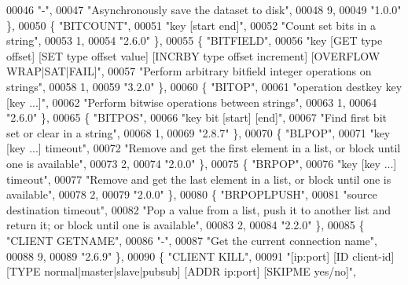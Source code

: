 \begin{DoxyCode}
00046     \textcolor{stringliteral}{"-"},
00047     \textcolor{stringliteral}{"Asynchronously save the dataset to disk"},
00048     9,
00049     \textcolor{stringliteral}{"1.0.0"} \},
00050     \{ \textcolor{stringliteral}{"BITCOUNT"},
00051     \textcolor{stringliteral}{"key [start end]"},
00052     \textcolor{stringliteral}{"Count set bits in a string"},
00053     1,
00054     \textcolor{stringliteral}{"2.6.0"} \},
00055     \{ \textcolor{stringliteral}{"BITFIELD"},
00056     \textcolor{stringliteral}{"key [GET type offset] [SET type offset value] [INCRBY type offset increment] [OVERFLOW
       WRAP|SAT|FAIL]"},
00057     \textcolor{stringliteral}{"Perform arbitrary bitfield integer operations on strings"},
00058     1,
00059     \textcolor{stringliteral}{"3.2.0"} \},
00060     \{ \textcolor{stringliteral}{"BITOP"},
00061     \textcolor{stringliteral}{"operation destkey key [key ...]"},
00062     \textcolor{stringliteral}{"Perform bitwise operations between strings"},
00063     1,
00064     \textcolor{stringliteral}{"2.6.0"} \},
00065     \{ \textcolor{stringliteral}{"BITPOS"},
00066     \textcolor{stringliteral}{"key bit [start] [end]"},
00067     \textcolor{stringliteral}{"Find first bit set or clear in a string"},
00068     1,
00069     \textcolor{stringliteral}{"2.8.7"} \},
00070     \{ \textcolor{stringliteral}{"BLPOP"},
00071     \textcolor{stringliteral}{"key [key ...] timeout"},
00072     \textcolor{stringliteral}{"Remove and get the first element in a list, or block until one is available"},
00073     2,
00074     \textcolor{stringliteral}{"2.0.0"} \},
00075     \{ \textcolor{stringliteral}{"BRPOP"},
00076     \textcolor{stringliteral}{"key [key ...] timeout"},
00077     \textcolor{stringliteral}{"Remove and get the last element in a list, or block until one is available"},
00078     2,
00079     \textcolor{stringliteral}{"2.0.0"} \},
00080     \{ \textcolor{stringliteral}{"BRPOPLPUSH"},
00081     \textcolor{stringliteral}{"source destination timeout"},
00082     \textcolor{stringliteral}{"Pop a value from a list, push it to another list and return it; or block until one is available"},
00083     2,
00084     \textcolor{stringliteral}{"2.2.0"} \},
00085     \{ \textcolor{stringliteral}{"CLIENT GETNAME"},
00086     \textcolor{stringliteral}{"-"},
00087     \textcolor{stringliteral}{"Get the current connection name"},
00088     9,
00089     \textcolor{stringliteral}{"2.6.9"} \},
00090     \{ \textcolor{stringliteral}{"CLIENT KILL"},
00091     \textcolor{stringliteral}{"[ip:port] [ID client-id] [TYPE normal|master|slave|pubsub] [ADDR ip:port] [SKIPME yes/no]"},

\end{DoxyCode}
